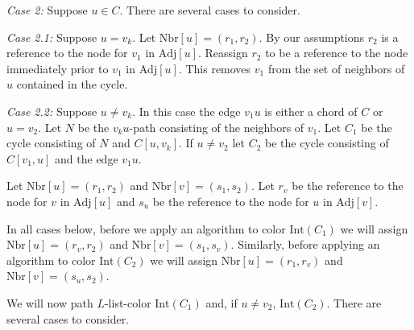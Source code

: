 \documentclass[letterpaper, 12pt]{article}
\theoremstyle{definition}
\theoremstyle{definition}
\theoremstyle{thm}
\theoremstyle{definition}
\begin{document}
\textit{Case 2:} Suppose $u\in C$. There are several cases to consider.

\textit{Case 2.1:} Suppose $u=v_k$. Let $\text{Nbr}[u]=(r_1,r_2)$. By our
assumptions $r_2$ is a reference to the node for $v_1$ in $\text{Adj}[u]$.
Reassign $r_2$ to be a reference to the node immediately prior to $v_1$ in
$\text{Adj}[u]$. This removes $v_1$ from the set of neighbors of $u$ contained
in the cycle.

\textit{Case 2.2:} Suppose $u\ne v_k$. In this case the edge $v_1u$ is either a
chord of $C$ or $u=v_2$. Let $N$ be the $v_ku$-path consisting of the neighbors
of $v_1$. Let $C_1$ be the cycle consisting of $N$ and $C[u,v_k]$. If $u\ne v_2$
let $C_2$ be the cycle consisting of $C[v_1,u]$ and the edge $v_1u$.

Let $\text{Nbr}[u]=(r_1,r_2)$ and
$\text{Nbr}[v]=(s_1,s_2)$. Let $r_v$ be the reference to the node for
$v$ in $\text{Adj}[u]$ and $s_u$ be the reference to the node for $u$ in
$\text{Adj}[v]$.

In all cases below, before we apply an algorithm to color
$\text{Int}(C_1)$ we will assign $\text{Nbr}[u]=(r_v,r_2)$ and $\text{Nbr}[v]=
(s_1,s_v)$. Similarly, before applying an algorithm to color $\text{Int}(C_2)$
we will assign $\text{Nbr}[u]=(r_1,r_v)$ and $\text{Nbr}[v]=(s_u,s_2)$.

We will now path $L$-list-color $\text{Int}(C_1)$ and, if $u\ne v_2$,
$\text{Int}(C_2)$. There are several cases to consider.
\end{document}
